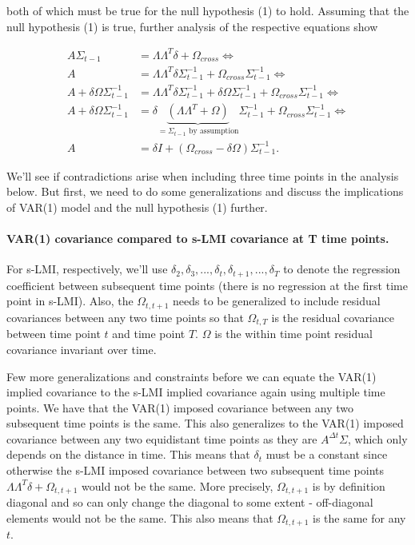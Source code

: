 \documentclass[
  letterpaper,
  DIV=11,
  numbers=noendperiod]{scrartcl}
\let\oldparagraph\paragraph
\renewcommand{\paragraph}[1]{\oldparagraph{#1}\mbox{}}
\begin{document}
both of which must be true for the null hypothesis (1) to hold. Assuming
that the null hypothesis (1) is true, further analysis of the respective
equations show

\[
\begin{aligned}
A\Sigma_{t-1} &= \Lambda\Lambda^T\delta+\Omega_{cross} \Leftrightarrow\\
A &= \Lambda\Lambda^T\delta \Sigma_{t-1}^{-1} + \Omega_{cross} \Sigma_{t-1}^{-1} \Leftrightarrow\\
A + \delta \Omega \Sigma_{t-1}^{-1} &= \Lambda\Lambda^T\delta \Sigma_{t-1}^{-1} + \delta \Omega \Sigma_{t-1}^{-1} + \Omega_{cross} \Sigma_{t-1}^{-1} \Leftrightarrow\\
A + \delta \Omega \Sigma_{t-1}^{-1} &= \delta \underbrace{(\Lambda\Lambda^T + \Omega)}_{=\Sigma_{t-1} \text{ by assumption}} \Sigma_{t-1}^{-1} + \Omega_{cross} \Sigma_{t-1}^{-1} \Leftrightarrow\\
A &= \delta I + (\Omega_{cross} - \delta \Omega)\Sigma_{t-1}^{-1}.
\end{aligned}
\]

We'll see if contradictions arise when including three time points in
the analysis below. But first, we need to do some generalizations and
discuss the implications of VAR(1) model and the null hypothesis (1)
further.

\hypertarget{var1-covariance-compared-to-s-lmi-covariance-at-t-time-points.}{%
\paragraph{VAR(1) covariance compared to s-LMI covariance at T time
points.}\label{var1-covariance-compared-to-s-lmi-covariance-at-t-time-points.}}

For s-LMI, respectively, we'll use
\(\delta_{2}, \delta_{3}, ..., \delta_t,\delta_{t+1},...,\delta_{T}\) to
denote the regression coefficient between subsequent time points (there
is no regression at the first time point in s-LMI). Also, the
\(\Omega_{t,t+1}\) needs to be generalized to include residual
covariances between any two time points so that \(\Omega_{t,T}\) is the
residual covariance between time point \(t\) and time point \(T\).
\(\Omega\) is the within time point residual covariance invariant over
time.

Few more generalizations and constraints before we can equate the VAR(1)
implied covariance to the s-LMI implied covariance again using multiple
time points. We have that the VAR(1) imposed covariance between any two
subsequent time points is the same. This also generalizes to the VAR(1)
imposed covariance between any two equidistant time points as they are
\(A^{\Delta t}\Sigma\), which only depends on the distance in time. This
means that \(\delta_t\) must be a constant since otherwise the s-LMI
imposed covariance between two subsequent time points
\(\Lambda\Lambda^T\delta + \Omega_{t,t+1}\) would not be the same. More
precisely, \(\Omega_{t,t+1}\) is by definition diagonal and so can only
change the diagonal to some extent - off-diagonal elements would not be
the same. This also means that \(\Omega_{t,t+1}\) is the same for any
\(t\).
\end{document}
